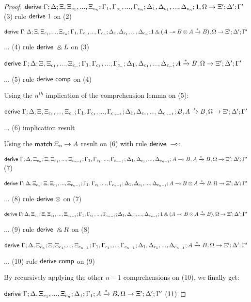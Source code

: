\begin{proof}
$\mathsf{derive}~ \Gamma; \Delta; \Xi, \Xi_{c_1}, ..., \Xi_{c_n}; \Gamma_1, \Gamma_{c_1}, ..., \Gamma_{c_n}; \Delta_1, \Delta_{c_1}, ..., \Delta_{c_n}; 1, \Omega \rightarrow \Xi'; \Delta'; \Gamma'$ \hfill (3) rule $\mathsf{derive}~ 1$ on (2)

$\mathsf{derive}~ \Gamma; \Delta; \Xi, \Xi_{c_1}, ..., \Xi_{c_n}; \Gamma_1, \Gamma_{c_1}, ..., \Gamma_{c_n}; \Delta_1, \Delta_{c_1}, ..., \Delta_{c_n}; 1 \mathbin{\binampersand} (A \multimap B \otimes A \xrightarrow{*} B), \Omega \rightarrow \Xi'; \Delta'; \Gamma'$

... \hfill (4) rule $\mathsf{derive}~ \mathbin{\binampersand} L$ on (3)


$\mathsf{derive}~ \Gamma; \Delta; \Xi, \Xi_{c_1}, ..., \Xi_{c_n}; \Gamma_1, \Gamma_{c_1}, ..., \Gamma_{c_n}; \Delta_1, \Delta_{c_1}, ..., \Delta_{c_n}; A \xrightarrow{*} B, \Omega \rightarrow \Xi'; \Delta'; \Gamma'$

... \hfill (5) rule $\mathsf{derive}~\mathsf{comp}$ on (4)

Using the $n^{th}$ implication of the comprehension lemma on (5):

$\mathsf{derive}~ \Gamma; \Delta; \Xi, \Xi_{c_1}, ..., \Xi_{c_n}; \Gamma_1, \Gamma_{c_1}, ..., \Gamma_{c_{n-1}}; \Delta_1, \Delta_{c_1}, ..., \Delta_{c_{n-1}}; B, A \xrightarrow{*} B, \Omega \rightarrow \Xi'; \Delta'; \Gamma'$

... \hfill (6) implication result

Using the $\mathsf{match} \; \Xi_n \rightarrow A$ result on (6) with rule $\mathsf{derive}~ \multimap$:

$\mathsf{derive}~ \Gamma; \Delta, \Xi_{c_n}; \Xi, \Xi_{c_1}, ..., \Xi_{c_{n-1}}; \Gamma_1, \Gamma_{c_1}, ..., \Gamma_{c_{n-1}}; \Delta_1, \Delta_{c_1}, ..., \Delta_{c_{n-1}}; A \multimap B, A \xrightarrow{*} B, \Omega \rightarrow \Xi'; \Delta'; \Gamma'$ \hfill (7)

$\mathsf{derive}~ \Gamma; \Delta, \Xi_{c_n}; \Xi, \Xi_{c_1}, ..., \Xi_{c_{n-1}}; \Gamma_1, \Gamma_{c_1}, ..., \Gamma_{c_{n-1}}; \Delta_1, \Delta_{c_1}, ..., \Delta_{c_{n-1}}; A \multimap B \otimes A \xrightarrow{*} B, \Omega \rightarrow \Xi'; \Delta'; \Gamma'$

... \hfill (8) rule $\mathsf{derive}~ \otimes$ on (7)

$\mathsf{derive}~ \Gamma; \Delta, \Xi_{c_n}; \Xi, \Xi_{c_1}, ..., \Xi_{c_{n-1}}; \Gamma_1, \Gamma_{c_1}, ..., \Gamma_{c_{n-1}}; \Delta_1, \Delta_{c_1}, ..., \Delta_{c_{n-1}}; 1 \mathbin{\binampersand} (A \multimap B \otimes A \xrightarrow{*} B), \Omega \rightarrow \Xi'; \Delta'; \Gamma'$

... \hfill (9) rule $\mathsf{derive}~ \mathbin{\binampersand} R$ on (8)

$\mathsf{derive}~ \Gamma; \Delta, \Xi_{c_n}; \Xi, \Xi_{c_1}, ..., \Xi_{c_{n-1}}; \Gamma_1, \Gamma_{c_1}, ..., \Gamma_{c_{n-1}}; \Delta_1, \Delta_{c_1}, ..., \Delta_{c_{n-1}}; A \xrightarrow{*} B, \Omega \rightarrow \Xi'; \Delta'; \Gamma'$

... \hfill (10) rule $\mathsf{derive}~ \mathsf{comp}$ on (9)

By recursively applying the other $n-1$ comprehensions on (10), we finally get:

$\mathsf{derive}~ \Gamma; \Delta, \Xi_{c_1}, ..., \Xi_{c_n}; \Delta_1; \Gamma_1; A \xrightarrow{*} B, \Omega \rightarrow \Xi'; \Delta'; \Gamma'$ \hfill (11)

\end{proof}
